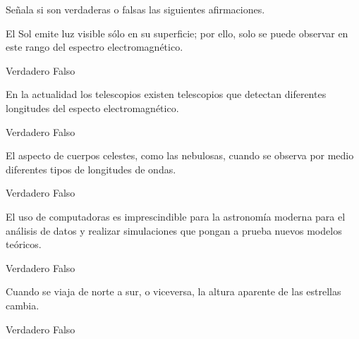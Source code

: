 Señala si son verdaderas o falsas las siguientes afirmaciones.
\begin{parts}
    El Sol emite luz visible sólo en su superficie; por ello, solo se puede observar en este rango del espectro electromagnético.
    {\footnotesize
    \begin{choices}
        \choice Verdadero
        \choice Falso
    \end{choices}
    }

    En la actualidad los telescopios existen telescopios que detectan diferentes longitudes del especto electromagnético.
    {\footnotesize
    \begin{choices}
        \choice Verdadero
        \choice Falso
    \end{choices}
    }

    El aspecto de cuerpos celestes, como las nebulosas, cuando se observa por medio diferentes tipos de longitudes de ondas.
        {\footnotesize
            \begin{choices}
                \choice Verdadero
                \choice Falso
            \end{choices}
        }

    El uso de computadoras es imprescindible para la astronomía moderna para el análisis de datos y realizar simulaciones que pongan a prueba nuevos modelos teóricos.
    {\footnotesize
    \begin{choices}
        \choice Verdadero
        \choice Falso
    \end{choices}
    }

    Cuando se viaja de norte a sur, o viceversa, la altura aparente de las estrellas cambia.
        {\footnotesize
            \begin{choices}
                \choice Verdadero
                \choice Falso
            \end{choices}
        }
\end{parts}